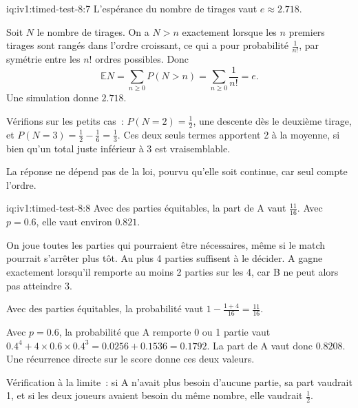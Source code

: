 \begin{solution}{iq:iv1:timed-test-8:7}
L'espérance du nombre de tirages vaut $e \approx 2.718$.

Soit $N$ le nombre de tirages. On a $N > n$ exactement lorsque les $n$ premiers tirages sont rangés dans l'ordre croissant, ce qui a pour probabilité $\frac{1}{n!}$, par symétrie entre les $n!$ ordres possibles. Donc
\[
\mathbb{E}N = \sum_{n \ge 0}P(N > n) = \sum_{n \ge 0}\frac{1}{n!} = e.
\]
Une simulation donne $2.718$.

Vérifions sur les petits cas~: $P(N = 2) = \frac12$, une descente dès le deuxième tirage, et $P(N = 3) = \frac12 - \frac16 = \frac13$. Ces deux seuls termes apportent 2 à la moyenne, si bien qu'un total juste inférieur à 3 est vraisemblable.

La réponse ne dépend pas de la loi, pourvu qu'elle soit continue, car seul compte l'ordre.

\end{solution}

\begin{solution}{iq:iv1:timed-test-8:8}
Avec des parties équitables, la part de A vaut $\frac{11}{16}$. Avec $p = 0.6$, elle vaut environ $0.821$.

On joue toutes les parties qui pourraient être nécessaires, même si le match pourrait s'arrêter plus tôt. Au plus 4 parties suffisent à le décider. A gagne exactement lorsqu'il remporte au moins 2 parties sur les 4, car B ne peut alors pas atteindre 3.

Avec des parties équitables, la probabilité vaut $1 - \frac{1 + 4}{16} = \frac{11}{16}$.

Avec $p = 0.6$, la probabilité que A remporte 0 ou 1 partie vaut $0.4^4 + 4 \times 0.6 \times 0.4^3 = 0.0256 + 0.1536 = 0.1792$. La part de A vaut donc $0.8208$. Une récurrence directe sur le score donne ces deux valeurs.

Vérification à la limite~: si A n'avait plus besoin d'aucune partie, sa part vaudrait 1, et si les deux joueurs avaient besoin du même nombre, elle vaudrait $\frac12$.


\end{solution}

